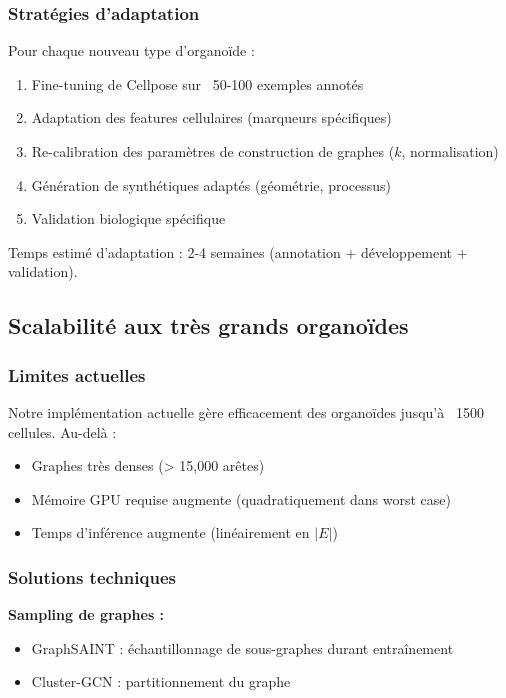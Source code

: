 \subsubsection{Stratégies d'adaptation}

Pour chaque nouveau type d'organoïde :
\begin{enumerate}
    \item Fine-tuning de Cellpose sur ~50-100 exemples annotés
    \item Adaptation des features cellulaires (marqueurs spécifiques)
    \item Re-calibration des paramètres de construction de graphes ($k$, normalisation)
    \item Génération de synthétiques adaptés (géométrie, processus)
    \item Validation biologique spécifique
\end{enumerate}

Temps estimé d'adaptation : 2-4 semaines (annotation + développement + validation).

\subsection{Scalabilité aux très grands organoïdes}

\subsubsection{Limites actuelles}

Notre implémentation actuelle gère efficacement des organoïdes jusqu'à ~1500 cellules. Au-delà :
\begin{itemize}
    \item Graphes très denses (> 15,000 arêtes)
    \item Mémoire GPU requise augmente (quadratiquement dans worst case)
    \item Temps d'inférence augmente (linéairement en $|E|$)
\end{itemize}

\subsubsection{Solutions techniques}

\textbf{Sampling de graphes :}
\begin{itemize}
    \item GraphSAINT : échantillonnage de sous-graphes durant entraînement
    \item Cluster-GCN : partitionnement du graphe
\end{itemize}

